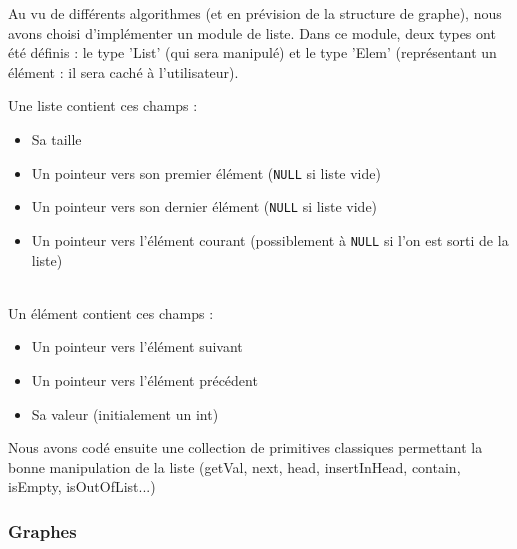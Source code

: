 \documentclass[a4paper,10pt]{article}
\newcommand*{\itemb}{\item[$\bullet$]}
\begin{document}
Au vu de différents algorithmes (et en prévision de la structure de graphe), nous avons choisi d'implémenter un module de liste.
Dans ce module, deux types ont été définis : le type 'List' (qui sera manipulé) et le type 'Elem' (représentant un élément : il sera caché à l'utilisateur).

Une liste contient ces champs :
\begin{itemize}
	\itemb Sa taille
	\itemb Un pointeur vers son premier élément (\texttt{NULL} si liste vide)
	\itemb Un pointeur vers son dernier élément (\texttt{NULL} si liste vide)
	\itemb Un pointeur vers l'élément courant (possiblement à \texttt{NULL} si l'on est sorti de la liste)
\end{itemize}
~~\\
Un élément contient ces champs :
\begin{itemize}
	\itemb Un pointeur vers l'élément suivant
	\itemb Un pointeur vers l'élément précédent
	\itemb Sa valeur (initialement un int)
\end{itemize}
\bigskip
Nous avons codé ensuite une collection de primitives classiques permettant la bonne manipulation de la liste (getVal, next, head, insertInHead, contain, isEmpty, isOutOfList...)

\subsubsection{Graphes}
\end{document}
